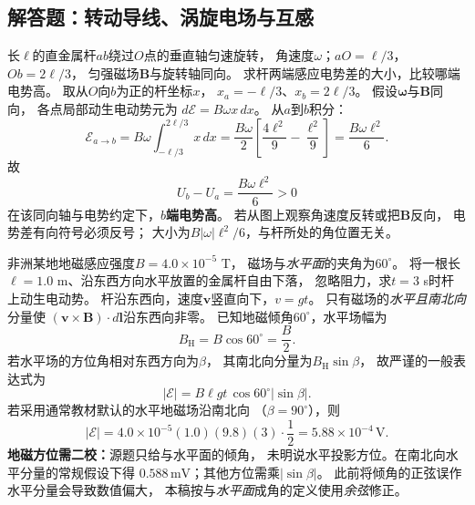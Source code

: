 
\subsection{解答题：转动导线、涡旋电场与互感}

\problemtext 长$\ell$的直金属杆$ab$绕过$O$点的垂直轴匀速旋转，
角速度$\omega$；$aO=\ell/3$，$Ob=2\ell/3$，
匀强磁场$\bm B$与旋转轴同向。
求杆两端感应电势差的大小，比较哪端电势高。
\workings
取从$O$向$b$为正的杆坐标$x$，
$x_a=-\ell/3$、$x_b=2\ell/3$。
假设$\bm\omega$与$\bm B$同向，
各点局部动生电动势元为
$d\mathcal E=B\omega x\,dx$。
从$a$到$b$积分：
\[
\mathcal E_{a\to b}
=B\omega\int_{-\ell/3}^{2\ell/3}x\,dx
=\frac{B\omega}{2}
\left[\frac{4\ell^2}{9}-\frac{\ell^2}{9}\right]
=\boxed{\frac{B\omega\ell^2}{6}}.
\]
故
\[
\boxed{U_b-U_a=\frac{B\omega\ell^2}{6}}>0
\]
在该同向轴与电势约定下，\textbf{$b$端电势高}。
\crosscheck 若从图上观察角速度反转或把$\bm B$反向，
电势差有向符号必须反号；
大小为$B|\omega|\ell^2/6$，与杆所处的角位置无关。

\problemtext 非洲某地地磁感应强度$B=4.0\times10^{-5}$ T，
磁场与\emph{水平面}的夹角为$60^\circ$。
将一根长$\ell=1.0$ m、沿东西方向水平放置的金属杆自由下落，
忽略阻力，求$t=3$ s时杆上动生电动势。
\workings
杆沿东西向，速度$\bm v$竖直向下，$v=gt$。
只有磁场的\emph{水平且南北向}分量使
$(\bm v\times\bm B)\cdot d\bm l$沿东西向非零。
已知地磁倾角$60^\circ$，水平场幅为
\[
\boxed{B_{\mathrm H}=B\cos60^\circ=\frac B2}.
\]
若水平场的方位角相对东西方向为$\beta$，
其南北向分量为$B_{\mathrm H}\sin\beta$，
故严谨的一般表达式为
\[
\boxed{|\mathcal E|=B\ell gt\,\cos60^\circ|\sin\beta|}.
\]
若采用通常教材默认的水平地磁场沿南北向
（$\beta=90^\circ$），则
\[
\boxed{|\mathcal E|=4.0\times10^{-5}(1.0)(9.8)(3)
\cdot\frac12
=5.88\times10^{-4}\,\mathrm V}.
\]
\crosscheck \textbf{地磁方位需二校：}源题只给与水平面的倾角，
未明说水平投影方位。在南北向水平分量的常规假设下得
$0.588\,\mathrm{mV}$；其他方位需乘$|\sin\beta|$。
此前将倾角的正弦误作水平分量会导致数值偏大，
本稿按与\emph{水平面}成角的定义使用\emph{余弦}修正。

